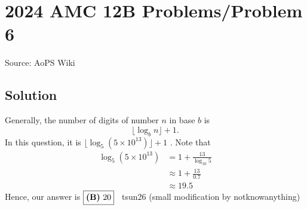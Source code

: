 \documentclass[12pt]{article}
\begin{document}
\section*{{2024 AMC 12B Problems/Problem 6}}
Source: AoPS Wiki

\subsection*{Solution}
Generally, the number of digits of number $n$ in base $b$ is \[\lfloor \log_b n \rfloor + 1.\] In this question, it is $\lfloor \log_{5} (5\times 10^{13})\rfloor+1$ .
Note that \begin{align*} \log_{5} (5\times 10^{13}) &= 1+\frac{13}{\log_{10} 5} \\ &\approx 1+\frac{13}{0.7} \\ &\approx 19.5 \end{align*} Hence, our answer is $\fbox{\textbf{(B)} 20}$ ~tsun26 (small modification by notknowanything)
\end{document}
